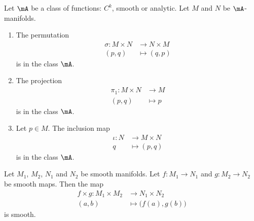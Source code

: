 \begin{proposition}      \label{PROPooCHVLooVFScOl}
	Let \( \mA\) be a class of functions: \( C^k\), smooth or analytic.  Let \( M\) and \( N\) be \( \mA\)-manifolds.
	\begin{enumerate}
		\item
		      The permutation
		      \begin{equation}
			      \begin{aligned}
				      \sigma\colon M\times N & \to N\times M \\
				      (p,q)                  & \mapsto (q,p)
			      \end{aligned}
		      \end{equation}
		      is in the class \( \mA\).
		\item       \label{ITEMooRFFAooRSeBPl}
		      The projection
		      \begin{equation}
			      \begin{aligned}
				      \pi_1\colon M\times N & \to M     \\
				      (p,q)                 & \mapsto p
			      \end{aligned}
		      \end{equation}
		      is in the class \( \mA\).
		\item
		      Let \( p\in M\). The inclusion map
		      \begin{equation}
			      \begin{aligned}
				      \iota\colon N & \to M\times N \\
				      q             & \mapsto (p,q)
			      \end{aligned}
		      \end{equation}
		      is in the class \( \mA\).
	\end{enumerate}
\end{proposition}

\begin{proposition}	\label{PROPooXFUTooCNzDHf}
	Let \( M_1\), \( M_2\), \( N_1\) and \( N_2\) be smooth manifolds. Let \(f \colon M_1\to N_1  \) and \(g \colon M_2\to N_2  \) be smooth maps. Then the map
	\begin{equation}
		\begin{aligned}
			f\times g\colon M_1\times M_2 & \to N_1\times N_2              \\
			(a,b)                         & \mapsto \big( f(a), g(b) \big)
		\end{aligned}
	\end{equation}
	is smooth.
\end{proposition}

